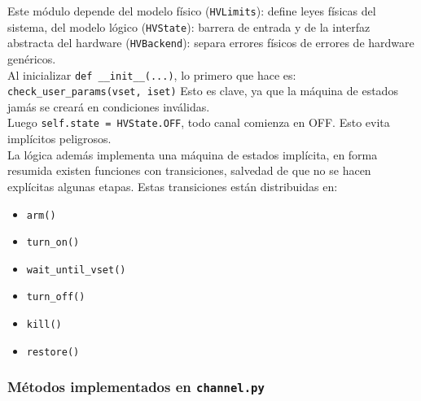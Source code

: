 \documentclass{article}
\begin{document}
Este módulo depende del modelo físico (\texttt{HVLimits}): define leyes físicas del sistema, del modelo lógico (\texttt{HVState}): barrera de entrada y de la interfaz abstracta del hardware (\texttt{HVBackend}): separa errores físicos de errores de hardware genéricos.\\

Al inicializar \texttt{def \_\_init\_\_(...)}, lo primero que hace es: \texttt{check\_user\_params(vset, iset)} Esto es clave, ya que la máquina de estados jamás se creará en condiciones inválidas. \\
Luego \texttt{self.state = HVState.OFF}, todo canal comienza en OFF. Esto evita implícitos peligrosos. \\

La lógica además implementa una máquina de estados implícita, en forma resumida existen funciones con transiciones, salvedad de que no se hacen explícitas algunas etapas. Estas transiciones están distribuidas en:
\begin{itemize}
    \item \texttt{arm()}
    \item \texttt{turn\_on()}
    \item \texttt{wait\_until\_vset()}
    \item \texttt{turn\_off()}
    \item \texttt{kill()}
    \item \texttt{restore()}
\end{itemize}

\subsubsection{Métodos implementados en \texttt{channel.py}}
\end{document}
